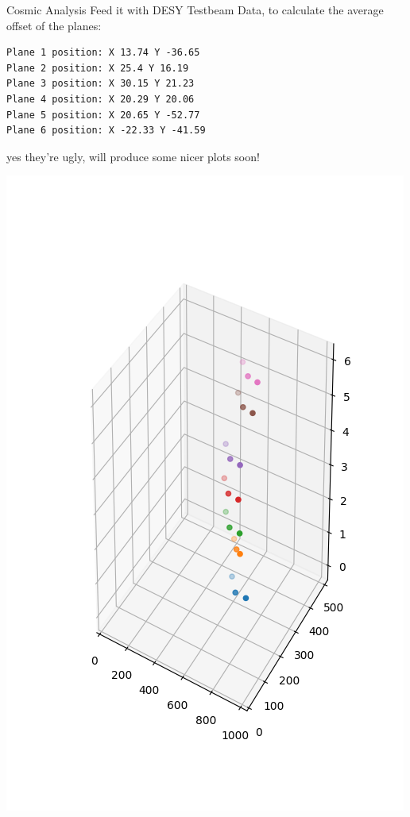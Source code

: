 \documentclass{beamer}
\begin{document}
\begin{frame}[fragile]{Cosmic Analysis}
    Feed it with DESY Testbeam Data, to calculate the average offset of the planes:
\begin{lstlisting}
Plane 1 position: X 13.74 Y -36.65
Plane 2 position: X 25.4 Y 16.19
Plane 3 position: X 30.15 Y 21.23
Plane 4 position: X 20.29 Y 20.06
Plane 5 position: X 20.65 Y -52.77
Plane 6 position: X -22.33 Y -41.59
\end{lstlisting}
\pause
\centering
\begin{minipage}{.13\textwidth}
    \tiny yes they're ugly, will produce some nicer plots soon!
\end{minipage}
\begin{minipage}{.30\textwidth}
    \centering
    \includegraphics[trim=0 50 0 100,clip,width=\textwidth]{DESY_Before.png}

\end{minipage}
\end{frame}
\end{document}
